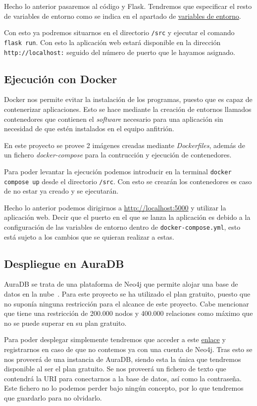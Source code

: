 Hecho lo anterior pasaremos al código y Flask. Tendremos que especificar el resto de variables de entorno como se indica en el apartado de \hyperref[sec:venv]{variables de entorno}.

Con esto ya podremos situarnos en el directorio \texttt{/src} y ejecutar el comando \texttt{flask run}. Con esto la aplicación web estará disponible en la dirección \texttt{http://localhost:} seguido del número de puerto que le hayamos asignado.
\subsection{Ejecución con Docker}
Docker nos permite evitar la instalación de los programas, puesto que es capaz de contenerizar aplicaciones. Esto se hace mediante la creación de entornos llamados contenedores que contienen el \textit{software} necesario para una aplicación sin necesidad de que estén instalados en el equipo anfitrión.

En este proyecto se provee 2 imágenes creadas mediante \textit{Dockerfiles}, además de un fichero \textit{docker-compose} para la contrucción y ejecución de contenedores.

Para poder levantar la ejecución podemos introducir en la terminal \texttt{docker compose up} desde el directorio \texttt{/src}. Con esto se crearán los contenedores es caso de no estar ya creado y se ejecutarán.

Hecho lo anterior podemos dirigirnos a \url{http://localhost:5000} y utilizar la aplicación web. Decir que el puerto en el que se lanza la aplicación es debido a la configuración de las variables de entorno dentro de \texttt{docker-compose.yml}, esto está sujeto a los cambios que se quieran realizar a estas.


\subsection{Despliegue en AuraDB}

AuraDB se trata de una plataforma de Neo4j que permite alojar una base de datos en la nube~\cite{neo4jNeo4jAura}. Para este proyecto se ha utilizado el plan gratuito, puesto que no suponía ninguna restricción para el alcance de este proyecto. Cabe mencionar que tiene una restricción de 200.000 nodos y 400.000 relaciones como máximo que no se puede superar en su plan gratuito.

Para poder desplegar simplemente tendremos que acceder a este \href{https://neo4j.com/cloud/platform/aura-graph-database/?ref=neo4j-home-hero}{enlace} y registrarnos en caso de que no contemos ya con una cuenta de Neo4j. Tras esto se nos proveerá de una instancia de AuraDB, siendo esta la única que tendremos disponible al ser el plan gratuito. Se nos proveerá un fichero de texto que contendrá la URI para conectarnos a la base de datos, así como la contraseña. Este fichero no lo podemos perder bajo ningún concepto, por lo que tendremos que guardarlo para no olvidarlo.

